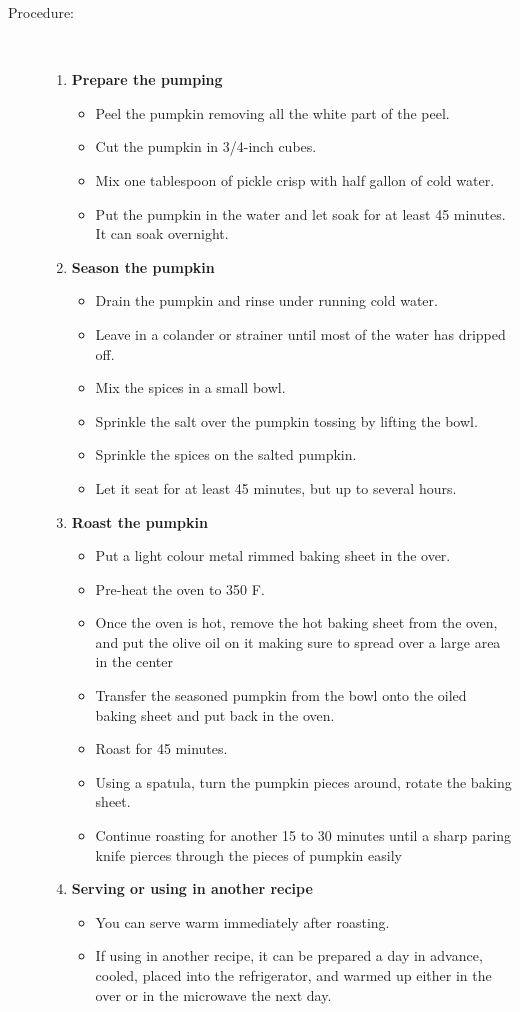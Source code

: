 \documentclass[11pt,letterpaper]{article}
\newcommand \fileName {MoroccanRoastedButternutSquash}
\begin{document}
\begin{description}
\item[Procedure:]\ \\
	\begin{enumerate}
	\item {\bf Prepare the pumping}
	\begin{itemize}
	\item Peel the pumpkin removing all the white part of the peel.
	\item Cut the pumpkin in 3/4-inch cubes.
	\item Mix one tablespoon of pickle crisp with half gallon of cold water.
	\item Put the pumpkin in the water and let soak for at least 45 minutes. It can soak overnight.
	\end{itemize}
	\item {\bf Season the pumpkin}
	\begin{itemize}
	\item Drain the pumpkin and rinse under running cold water.
	\item Leave in a colander or strainer until most of the water has dripped off.
	\item Mix the spices in a small bowl.
	\item Sprinkle the salt over the pumpkin tossing by lifting the bowl.
	\item Sprinkle the spices on the salted pumpkin.
	\item Let it seat for at least 45 minutes, but up to several hours.
	\end{itemize}
	\item {\bf Roast the pumpkin}
	\begin{itemize}
	\item Put a light colour metal rimmed baking sheet in the over.
	\item Pre-heat the oven to 350 F.
	\item Once the oven is hot, remove the hot baking sheet from the oven, and put the olive oil on it making sure to spread over a large area in the center
	\item Transfer the seasoned pumpkin from the bowl onto the oiled baking sheet and put back in the oven.
	\item Roast for 45 minutes.
	\item Using a spatula, turn the pumpkin pieces around, rotate the baking sheet.
	\item Continue roasting for another 15 to 30 minutes until a sharp paring knife pierces through the pieces of pumpkin easily
	\end{itemize}
	\item {\bf Serving or using in another recipe}
	\begin{itemize}
	\item You can serve warm immediately after roasting.
	\item If using in another recipe, it can be prepared a day in advance, cooled, placed into the refrigerator, and warmed up either in the over or in the microwave the next day.
	\end{itemize}
	\end{enumerate}
\end{description}


\end{document}
